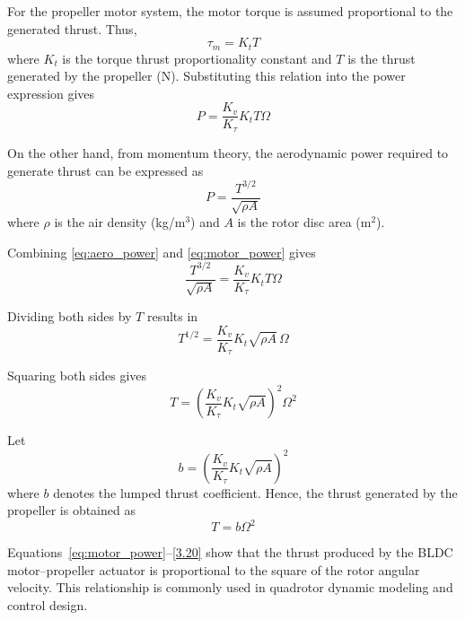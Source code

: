 \begin{small}
For the propeller motor system, the motor torque is assumed proportional to the generated thrust. Thus,
\begin{equation}
\tau_m = K_t T
\end{equation}
where $K_t$ is the torque thrust proportionality constant and $T$ is the thrust generated by the propeller (N). Substituting this relation into the power expression gives
\begin{equation}
P = \frac{K_v}{K_{\tau}} K_t T \Omega
\label{eq:motor_power}
\end{equation}

On the other hand, from momentum theory, the aerodynamic power required to generate thrust can be expressed as
\begin{equation}
P = \frac{T^{3/2}}{\sqrt{\rho A}}
\label{eq:aero_power}
\end{equation}
where $\rho$ is the air density (kg/m$^3$) and $A$ is the rotor disc area (m$^2$).

Combining \eqref{eq:aero_power} and \eqref{eq:motor_power} gives
\begin{equation}
\frac{T^{3/2}}{\sqrt{\rho A}} = \frac{K_v}{K_{\tau}} K_t T \Omega
\end{equation}

Dividing both sides by $T$ results in
\begin{equation}
T^{1/2} = \frac{K_v}{K_{\tau}} K_t \sqrt{\rho A}\,\Omega
\end{equation}

Squaring both sides gives
\begin{equation}
T = \left( \frac{K_v}{K_{\tau}} K_t \sqrt{\rho A} \right)^2 \Omega^2
\end{equation}

Let
\begin{equation}
b = \left( \frac{K_v}{K_{\tau}} K_t \sqrt{\rho A} \right)^2
\end{equation}
where $b$ denotes the lumped thrust coefficient. Hence, the thrust generated by the propeller is obtained as
\begin{equation}
T = b \Omega^2
\label{3.20}
\end{equation}

Equations~\eqref{eq:motor_power}--\eqref{3.20} show that the thrust produced by the BLDC motor--propeller actuator is proportional to the square of the rotor angular velocity. This relationship is commonly used in quadrotor dynamic modeling and control design.




\end{small}
